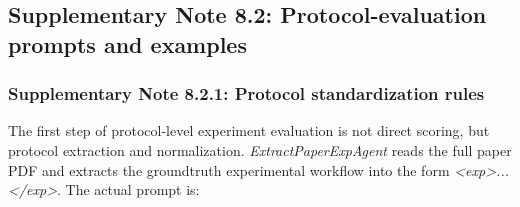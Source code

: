 \subsection*{Supplementary Note 8.2: Protocol-evaluation prompts and examples}
{}

\subsubsection*{Supplementary Note 8.2.1: Protocol standardization rules}
{}
The first step of protocol-level experiment evaluation is not direct scoring, but protocol extraction and normalization. \textit{ExtractPaperExpAgent} reads the full paper PDF and extracts the groundtruth experimental workflow into the form \textit{<exp>...</exp>}. The actual prompt is:
